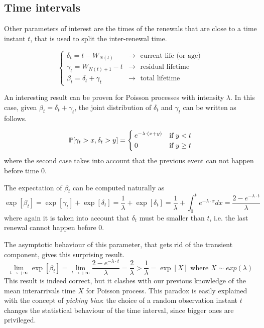 \subsection{Time intervals}
	Other parameters of interest are the times of the renewals that are close to a time instant $t$, that is used to split the inter-renewal time.

	\begin{equation} \begin{cases}
		\delta_t = t - W_{N(t)} & \rightarrow
			\text{~~current life (or age)} \\
		\gamma_t = W_{N(t)+1}-t & \rightarrow
			\text{~~residual lifetime} \\
		\beta_t = \delta_t + \gamma_t & \rightarrow
			\text{~~total lifetime}
	\end{cases} \end{equation}

	\bigbreak
	An interesting result can be proven for Poisson processes with intensity $\lambda$.
	In this case, given $\beta_t = \delta_t + \gamma_t$, the joint distribution of $\delta_t$ and $\gamma_t$ can be written as follows.

	\begin{equation}
		\mathbb{P}[\gamma_t > x, \delta_t > y ] =
		\begin{cases}
			e^{-\lambda \cdot (x+y)} & \text{if } y < t \\
			0 & \text{if } y \ge t \\
		\end{cases}
	\end{equation}
	where the second case takes into account that the previous event can not happen before time 0.

	The expectation of $\beta_t$ can be computed naturally as
	\begin{equation*}
		\exp[\beta_t] = \exp[\gamma_t] + \exp[\delta_t] =
		\frac{1}{\lambda} + \exp[\delta_t] =
		\frac{1}{\lambda} + \int_0^t e^{-\lambda \cdot x} dx =
		\frac{2-e^{-\lambda \cdot t}}{\lambda}
	\end{equation*}
	where again it is taken into account that $\delta_t$ must be smaller than $t$, i.e. the last renewal cannot happen before 0.

	The asymptotic behaviour of this parameter, that gets rid of the transient component, gives this surprising result.
	\begin{equation*}
		\lim_{t \to +\infty} \exp[\beta_t] = \lim_{t \to +\infty} \frac{2-e^{-\lambda \cdot t}}{\lambda} = \frac{2}{\lambda} > \frac{1}{\lambda} = \exp[X] \text{ where } X \sim exp(\lambda)
	\end{equation*}
	This result is indeed correct, but it clashes with our previous knowledge of the mean interarrivals time $X$ for Poisson process.
	This paradox is easily explained with the concept of \emph{picking bias}: the choice of a random observation instant $t$ changes the statistical behaviour of the time interval, since bigger ones are privileged.

